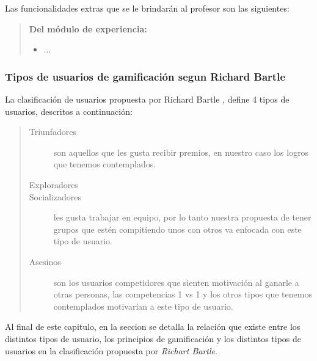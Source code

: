     \noindent
    Las funcionalidades extras que se le brindarán al profesor son las siguientes:

    \begin{quote}

    {\bf Del módulo de experiencia:}
        \begin{itemize}
        \item ...
        \end{itemize}

    \end{quote}

    \subsubsection{Tipos de usuarios de gamificación segun Richard Bartle}

    La clasificación de usuarios propuesta por Richard Bartle \cite{TiposDeUsuario}, define
    4 tipos de usuarios, descritos a continuación:
    
        \begin{quote}
        \begin{description}
        \item[Triunfadores]
                son aquellos que les gusta recibir premios, en nuestro caso los logros
                que tenemos contemplados.

        \item[Exploradores] 

        \item[Socializadores]
                les gusta trabajar en equipo, por lo tanto nuestra propuesta de tener
                grupos que estén compitiendo unos con otros va enfocada con este tipo
                de usuario.

        \item[Asesinos]
                son los usuarios competidores que sienten motivación al ganarle a otras
                personas, las competencias 1 vs 1 y los otros tipos que tenemos
                contemplados motivarían a este tipo de usuario.
        \end{description}
        \end{quote}

    \noindent 
    Al final de este capitulo, en la seccion  se detalla
    la relación que existe entre los distintos tipos de usuario, los principios de
    gamificación y los distintos tipos de usuarios en la clasificación propuesta por
    {\it Richart Bartle}.

